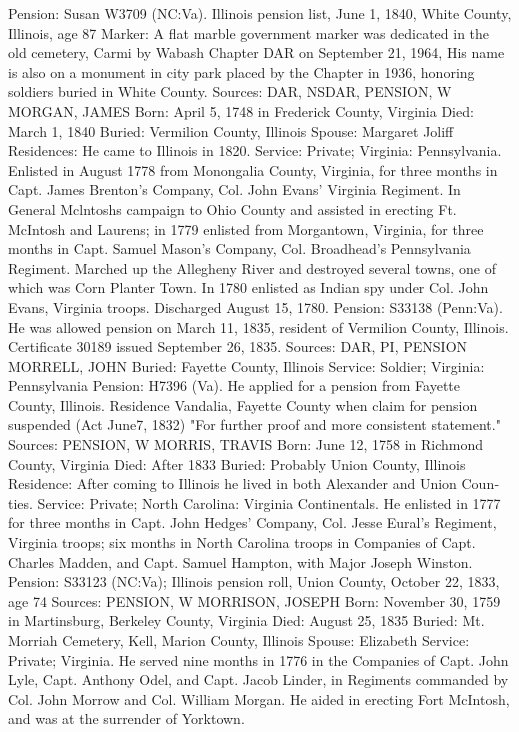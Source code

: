Pension: Susan W3709 (NC:Va). Illinois pension list, June 1, 1840, White County, Illinois, age 87 
Marker: A flat marble government marker was dedicated in the old cemetery, Carmi by Wabash Chapter DAR on September 21, 1964, His name is also on a monument in city park placed by the Chapter in 1936, honoring soldiers buried in White County. 
Sources: DAR, NSDAR, PENSION, W 
MORGAN, JAMES 
Born: April 5, 1748 in Frederick County, Virginia 
Died: March 1, 1840 
Buried: Vermilion County, Illinois 
Spouse: Margaret Joliff 
Residences: He came to Illinois in 1820. 
Service: Private; Virginia: Pennsylvania. Enlisted in August 1778 from Monongalia County, Virginia, for three months in Capt. James Brenton's Company, Col. John Evans' Virginia Regiment. In General Mclntoshs campaign to Ohio County and assisted in erecting Ft. McIntosh and Laurens; in 1779 enlisted from Morgantown, Virginia, for three months in Capt. Samuel Mason's Company, Col. Broadhead's Pennsylvania Regiment. Marched up the Alle­gheny River and destroyed several towns, one of which was Corn Planter Town. In 1780 enlisted as Indian spy under Col. John Evans, Virginia troops. Discharged August 15, 1780. 
Pension: S33138 (Penn:Va). He was allowed pension on March 11, 1835, resident of Vermilion County, Illinois. Certificate 30189 issued September 26, 1835. 
Sources: DAR, PI, PENSION 
MORRELL, JOHN 
Buried: Fayette County, Illinois 
Service: Soldier; Virginia: Pennsylvania 
Pension: H7396 (Va). He applied for a pension from Fayette County, Illinois. Residence Vandalia, Fayette County when claim for pension suspended (Act June7, 1832) "For further proof and more consistent statement." 
Sources: PENSION, W 
MORRIS, TRAVIS 
Born: June 12, 1758 in Richmond County, Virginia 
Died: After 1833 
Buried: Probably Union County, Illinois 
Residence: After coming to Illinois he lived in both Alexander and Union Coun­ties. 
Service: Private; North Carolina: Virginia Continentals. He enlisted in 1777 for three months in Capt. John Hedges' Company, Col. Jesse Eural's Regiment, Virginia troops; six months in North Carolina troops in Companies of Capt. Charles Madden, and Capt. Samuel Hampton, with Major Joseph Winston. 
Pension: S33123 (NC:Va); Illinois pension roll, Union County, October 22, 1833, age 74 
Sources: PENSION, W 
MORRISON, JOSEPH 
Born: November 30, 1759 in Martinsburg, Berkeley County, Virginia
Died: August 25, 1835
Buried: Mt. Morriah Cemetery, Kell, Marion County, Illinois
Spouse: Elizabeth
Service: Private; Virginia. He served nine months in 1776 in the Companies of 
Capt. John Lyle, Capt. Anthony Odel, and Capt. Jacob Linder, in Regiments commanded by Col. John Morrow and Col. William Morgan. He aided in erecting Fort McIntosh, and was at the surrender of Yorktown. 
